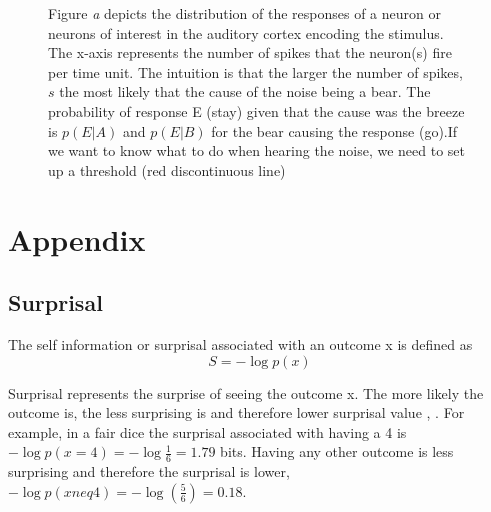 \documentclass[11pt, onecolumn]{article}
\newcommand{\myreferences}{C:/workspace/gitgub/bibliography-jgr/bibliojgr}
\begin{document}
\begin{figure}[H]
    \hfill
    \caption{Figure \emph{a} depicts the distribution of the responses of a neuron or neurons of interest in the auditory cortex encoding the stimulus. The x-axis represents the number of spikes that the neuron(s) fire per time unit. The intuition is that the larger the number of spikes, $s$ the most likely that the cause of the noise being a bear. The probability of response E (stay) given that the cause was the breeze is $p(E|A)$ and  $p(E|B)$ for the bear causing the response (go).If we want to know what to do when hearing the noise, we need to set up a threshold (red discontinuous line) }
    \label{fig:lkhratio}
\end{figure}

%


\section*{Appendix}
\label{se:ap}
\subsection{Surprisal}
The self information or surprisal associated with an outcome x is defined as 
\begin{equation}
S = -\log p(x)
\label{eq:s}
\end{equation}

Surprisal represents  the surprise of seeing the outcome x. The more likely the outcome is, the less surprising is and therefore lower surprisal value \cite{tribus_thermostatics_1961},  \cite{barto_novelty_2013}. For example, in a fair dice the surprisal associated with having a 4 is $-\log p(x =4) = -\log \frac{1}{6} =1.79$ bits. Having any other outcome is less surprising and therefore the surprisal is lower, $-\log p(x neq 4) = -\log (\frac{5}{6}) =0.18$.
\end{document}

